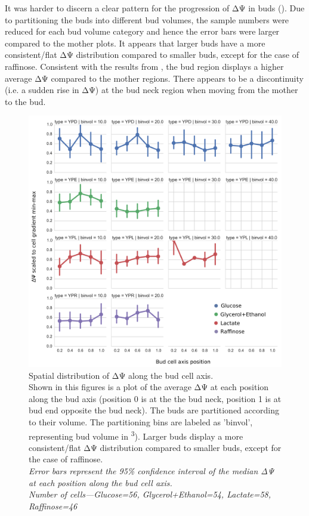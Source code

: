 It was harder to discern a clear pattern for the progression of ΔΨ in buds (). Due to partitioning the buds into different bud volumes, the sample numbers were reduced for each bud volume category and hence the error bars were larger compared to the mother plots. It appears that larger buds have a more consistent/flat ΔΨ distribution compared to smaller buds, except for the case of raffinose. Consistent with the results from , the bud region displays a higher average ΔΨ compared to the mother regions. There appears to be a discontinuity (i.e. a sudden rise in ΔΨ) at the bud neck region when moving from the mother to the bud. 
%
\begin{figure}[htp]
	\centering
    \includegraphics[width=.8\textwidth]{aldybud}
    \caption[Spatial distribution of ΔΨ along the bud cell axis]{Spatial distribution of ΔΨ along the bud cell axis.\\Shown in this figures is a plot of the average ΔΨ at each position along the bud axis (position 0 is at the the bud neck, position 1 is at bud end opposite the bud neck). The buds are partitioned according to their volume. The partitioning bins are labeled as 'binvol', representing bud volume in \si{\micron\cubed}). Larger buds display a more consistent/flat ΔΨ distribution compared to smaller buds, except for the case of raffinose.\\\emph{Error bars represent the 95\% confidence interval of the median ΔΨ at each position along the bud cell axis.\\Number of cells---Glucose=56, Glycerol+Ethanol=54, Lactate=58, Raffinose=46}}\label{fig:aldybud}
\end{figure}
%
